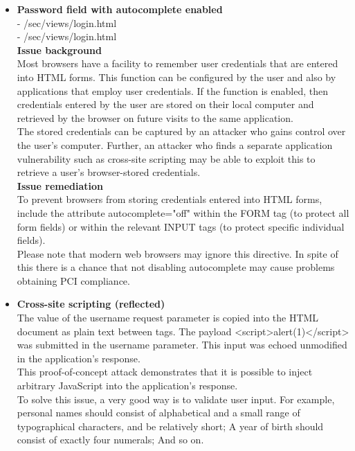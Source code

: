 \begin{itemize}
\item \textbf{Password field with autocomplete enabled} \\
- /sec/views/login.html \\
- /sec/views/login.html \\

\textbf{Issue background} \\
Most browsers have a facility to remember user credentials that are entered into HTML forms. This function can be configured by the user and also by applications that employ user credentials. If the function is enabled, then credentials entered by the user are stored on their local computer and retrieved by the browser on future visits to the same application.\\

The stored credentials can be captured by an attacker who gains control over the user's computer. Further, an attacker who finds a separate application vulnerability such as cross-site scripting may be able to exploit this to retrieve a user's browser-stored credentials.\\

\textbf{Issue remediation} \\
To prevent browsers from storing credentials entered into HTML forms, include the attribute autocomplete="off" within the FORM tag (to protect all form fields) or within the relevant INPUT tags (to protect specific individual fields). \\

Please note that modern web browsers may ignore this directive. In spite of this there is a chance that not disabling autocomplete may cause problems obtaining PCI compliance.\\


\item \textbf{Cross-site scripting (reflected)} \\

The value of the username request parameter is copied into the HTML document as plain text between tags. The payload <script>alert(1)</script> was submitted in the username parameter. This input was echoed unmodified in the application's response. \\

This proof-of-concept attack demonstrates that it is possible to inject arbitrary JavaScript into the application's response. \\

To solve this issue, a very good way is to validate user input. For example, personal names should consist of alphabetical and a small range of typographical characters, and be relatively short; A year of birth should consist of exactly four numerals; And so on.

\end{itemize}

